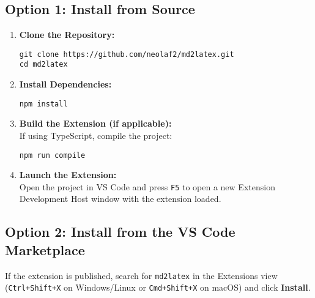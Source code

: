 \documentclass{article}
\begin{document}
\subsection*{Option 1: Install from Source}
\begin{enumerate}
  \item \textbf{Clone the Repository:}
  \begin{lstlisting}[basicstyle=\ttfamily,breaklines=true]
git clone https://github.com/neolaf2/md2latex.git
cd md2latex
  \end{lstlisting}
  
  \item \textbf{Install Dependencies:}
  \begin{lstlisting}[basicstyle=\ttfamily,breaklines=true]
npm install
  \end{lstlisting}
  
  \item \textbf{Build the Extension (if applicable):}\\
  If using TypeScript, compile the project:
  \begin{lstlisting}[basicstyle=\ttfamily,breaklines=true]
npm run compile
  \end{lstlisting}
  
  \item \textbf{Launch the Extension:}\\
  Open the project in VS Code and press \texttt{F5} to open a new Extension Development Host window with the extension loaded.
\end{enumerate}

\subsection*{Option 2: Install from the VS Code Marketplace}
If the extension is published, search for \texttt{md2latex} in the Extensions view (\texttt{Ctrl+Shift+X} on Windows/Linux or \texttt{Cmd+Shift+X} on macOS) and click \textbf{Install}.
\end{document}
